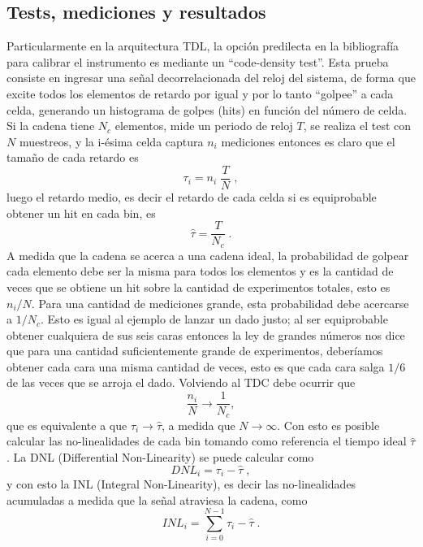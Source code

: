 \subsection{Tests, mediciones y resultados}
Particularmente en la arquitectura TDL, la opción predilecta en la bibliografía para calibrar el instrumento es mediante 
un ``code-density test''. Esta prueba consiste en ingresar una señal decorrelacionada del reloj del sistema, de forma que 
excite todos los elementos de retardo por igual y por lo tanto ``golpee'' a cada celda, generando un
histograma de golpes (hits) en función del número de celda. Si la cadena tiene
$N_c$ elementos, mide un periodo de reloj $T$, se realiza el test con $N$ muestreos,
y la i-ésima celda captura $n_i$ mediciones entonces es claro que el 
tamaño de cada retardo es
\begin{equation}
     \tau_i = n_i \; \dfrac{T}{N} \; ,
     \label{eq: tau_i}
\end{equation}
luego el retardo medio, es decir el retardo de cada celda si es equiprobable obtener un hit 
en cada bin, es
\begin{equation}
     \hat{\tau} = \dfrac{T}{N_c} \; .
     \label{eq: tau_medio}
\end{equation}
A medida que la cadena se acerca a una cadena ideal, la probabilidad de golpear cada
elemento debe ser la misma para todos los elementos y es la cantidad de veces que se obtiene un hit
sobre la cantidad de experimentos totales, esto es $n_i/N$. Para una cantidad de mediciones grande,
esta probabilidad debe acercarse a $1/N_c$. Esto es igual al ejemplo de lanzar un dado justo; al ser
equiprobable obtener cualquiera de sus seis caras entonces la ley de grandes números nos dice
que para una cantidad suficientemente grande de experimentos, deberíamos obtener cada cara una misma cantidad
de veces, esto es que cada cara salga $1/6$ de las veces que se arroja el dado.
Volviendo al TDC debe ocurrir que 
\begin{equation*}
     \dfrac{n_i}{N} \longrightarrow \dfrac{1}{N_c},
\end{equation*}
que es equivalente a que $\tau_i \longrightarrow \hat{\tau}$, a medida que $N \rightarrow \infty$.
Con esto es posible calcular las no-linealidades de cada bin tomando como referencia
el tiempo ideal $\hat{\tau}$. La DNL (Differential Non-Linearity) 
se puede calcular como
\begin{equation}
     DNL_i = \tau_i - \hat{\tau} \; ,
     \label{eq: DNL}
\end{equation}
y con esto la INL (Integral Non-Linearity), es decir las no-linealidades acumuladas a medida que la 
señal atraviesa la cadena, como
\begin{equation}
     INL_i = \sum_{i=0}^{N-1} {\tau_i - \hat{\tau}} \; .
     \label{eq: INL}
\end{equation}


